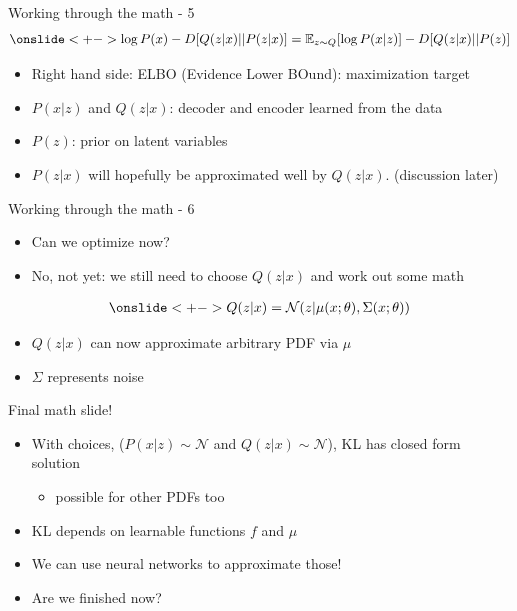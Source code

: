 \documentclass[10pt,aspectratio=169]{beamer}
\begin{document}
\begin{frame}{Working through the math - 5}
    \begin{align*}
        \onslide<+->{\log P(x) - D[Q(z|x)||P(z|x)] = \mathbb{E}_{z\sim Q}[\log P(x|z)] - D[Q(z|x)||P(z)]}
    \end{align*}
    
    \begin{itemize}[<+->]
        \item Right hand side: ELBO (Evidence Lower BOund): maximization target
        \item $P(x|z)$ and $Q(z|x)$: decoder and encoder learned from the data
        \item $P(z)$: prior on latent variables
        \item $P(z|x)$ will hopefully be approximated well by $Q(z|x)$. (discussion later)
    \end{itemize}
\end{frame}
\begin{frame}{Working through the math - 6}
    \begin{itemize}[<+->]
        \item Can we optimize now?
        \item No, not yet: we still need to choose $Q(z|x)$ and work out some math
    \end{itemize}
    \begin{align*}
        \onslide<+->{Q(z|x) = \mathcal{N}(z|\mu(x;\theta),\Sigma(x;\theta))}
    \end{align*}

    \begin{itemize}[<+->]
        \item $Q(z|x)$ can now approximate arbitrary PDF via $\mu$
        \item $\Sigma$ represents noise
    \end{itemize}
\end{frame}

\begin{frame}{Final math slide!}
    \begin{itemize}[<+->]
        \item With choices, ($P(x|z)\sim\mathcal{N}$ and $Q(z|x)\sim\mathcal{N}$), KL has closed form solution
            \begin{itemize}
                \item possible for other PDFs too
            \end{itemize}
        \item KL depends on learnable functions $f$ and $\mu$
        \item We can use neural networks to approximate those!
        \item Are we finished now?
    \end{itemize}
\end{frame}
\end{document}
